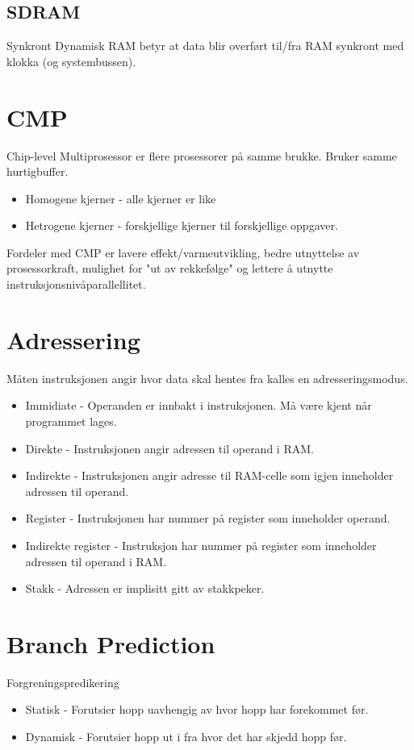 \documentclass[a4paper, 10pt]{article}
\begin{document}
\subsection{SDRAM} 
Synkront Dynamisk RAM betyr at data blir overført til/fra RAM synkront med klokka (og systembussen).

\section{CMP}
Chip-level Multiprosessor er flere prosessorer på samme brukke. Bruker samme hurtigbuffer.

\begin{itemize}
	\item Homogene kjerner - alle kjerner er like
	\item Hetrogene kjerner - forskjellige kjerner til forskjellige oppgaver.
\end{itemize}

Fordeler med CMP er lavere effekt/varmeutvikling, bedre utnyttelse av prosessorkraft, mulighet for "ut av rekkefølge" og lettere å utnytte instruksjonsnivåparallellitet.

\section{Adressering}
Måten instruksjonen angir hvor data skal hentes fra kalles en adresseringsmodus.

\begin{itemize}
	\item Immidiate - Operanden er innbakt i instruksjonen. Må være kjent når programmet lages.
	\item Direkte - Instruksjonen angir adressen til operand i RAM.
	\item Indirekte - Instruksjonen angir adresse til RAM-celle som igjen inneholder adressen til operand.
	\item Register - Instruksjonen har nummer på register som inneholder operand.
	\item Indirekte register - Instruksjon har nummer på register som inneholder adressen til operand i RAM.
	\item Stakk - Adressen er implisitt gitt av stakkpeker.
\end{itemize}


\section{Branch Prediction}
Forgreningspredikering

\begin{itemize}
	\item Statisk - Forutsier hopp uavhengig av hvor hopp har forekommet før.
	\item Dynamisk - Forutsier hopp ut i fra hvor det har skjedd hopp før.
\end{itemize}
\end{document}
